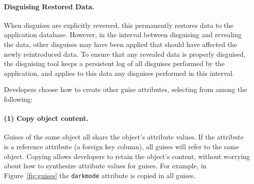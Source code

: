\paragraph{Disguising Restored Data.}
When disguises are explicitly reversed, this permanently restores data to the application database.
However, in the interval between disguising and revealing the data, other disguises may have been applied that
should have affected the newly reintroduced data. To ensure that any revealed data is properly disguised,
the disguising tool keeps a persistent log of all disguises performed by the application, and
applies to this data any disguises performed in this interval.


\iffalse
%

%
%
%
Developers choose how to create other guise attributes, selecting from among the following:
%
\paragraph{(1) Copy object content.}
%
Guises of the same object all share the object's attribute values.
%
If the attribute is a reference attribute (\eg a foreign key column), all guises will refer to the same object.
%
%
Copying allows developers to retain the object's content, without worrying about how to
synthesize attribute values for guises.
%
For example, in Figure~\ref{fig:guises} the \texttt{darkmode} attribute is copied in
all guises.

